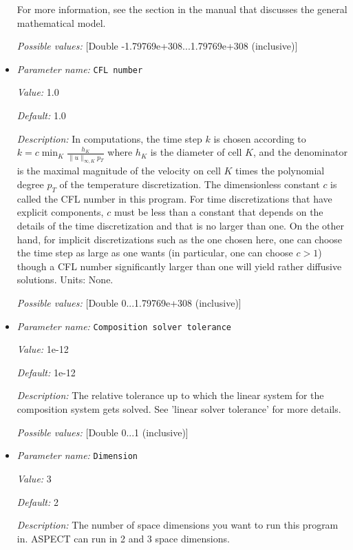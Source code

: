 \begin{itemize}
For more information, see the section in the manual that discusses the general mathematical model.


{\it Possible values:} [Double -1.79769e+308...1.79769e+308 (inclusive)]
\item {\it Parameter name:} {\tt CFL number}
\label{parameters:CFL number}


{\it Value:} 1.0


{\it Default:} 1.0


{\it Description:} In computations, the time step $k$ is chosen according to $k = c \min_K \frac {h_K} {\|u\|_{\infty,K} p_T}$ where $h_K$ is the diameter of cell $K$, and the denominator is the maximal magnitude of the velocity on cell $K$ times the polynomial degree $p_T$ of the temperature discretization. The dimensionless constant $c$ is called the CFL number in this program. For time discretizations that have explicit components, $c$ must be less than a constant that depends on the details of the time discretization and that is no larger than one. On the other hand, for implicit discretizations such as the one chosen here, one can choose the time step as large as one wants (in particular, one can choose $c>1$) though a CFL number significantly larger than one will yield rather diffusive solutions. Units: None.


{\it Possible values:} [Double 0...1.79769e+308 (inclusive)]
\item {\it Parameter name:} {\tt Composition solver tolerance}
\label{parameters:Composition solver tolerance}


{\it Value:} 1e-12


{\it Default:} 1e-12


{\it Description:} The relative tolerance up to which the linear system for the composition system gets solved. See 'linear solver tolerance' for more details.


{\it Possible values:} [Double 0...1 (inclusive)]
\item {\it Parameter name:} {\tt Dimension}
\label{parameters:Dimension}


{\it Value:} 3


{\it Default:} 2


{\it Description:} The number of space dimensions you want to run this program in. ASPECT can run in 2 and 3 space dimensions.



\end{itemize}
